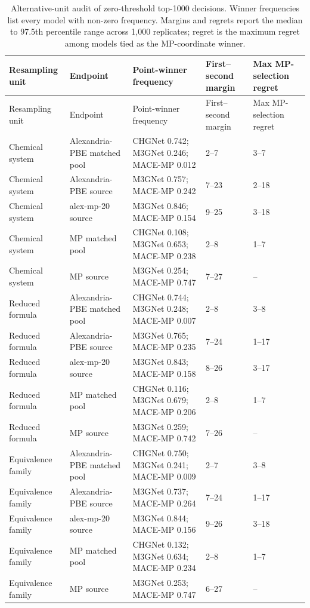 \begin{longtable}{@{}P{0.16\textwidth}P{0.20\textwidth}P{0.31\textwidth}P{0.10\textwidth}P{0.10\textwidth}@{}}
\caption{Alternative-unit audit of zero-threshold top-1000 decisions. Winner frequencies list every model with non-zero frequency. Margins and regrets report the median to 97.5th percentile range across 1,000 replicates; regret is the maximum regret among models tied as the MP-coordinate winner.}\label{tab:a1-decisions}\\
\toprule
Resampling unit & Endpoint & Point-winner frequency & First--second margin & Max MP-selection regret \\
\midrule
\endfirsthead
\toprule
Resampling unit & Endpoint & Point-winner frequency & First--second margin & Max MP-selection regret \\
\midrule
\endhead
\bottomrule
\endfoot
Chemical system & Alexandria-PBE matched pool & CHGNet 0.742; M3GNet 0.246; MACE-MP 0.012 & 2--7 & 3--7 \\
Chemical system & Alexandria-PBE source & M3GNet 0.757; MACE-MP 0.242 & 7--23 & 2--18 \\
Chemical system & alex-mp-20 source & M3GNet 0.846; MACE-MP 0.154 & 9--25 & 3--18 \\
Chemical system & MP matched pool & CHGNet 0.108; M3GNet 0.653; MACE-MP 0.238 & 2--8 & 1--7 \\
Chemical system & MP source & M3GNet 0.254; MACE-MP 0.747 & 7--27 & -- \\
Reduced formula & Alexandria-PBE matched pool & CHGNet 0.744; M3GNet 0.248; MACE-MP 0.007 & 2--8 & 3--8 \\
Reduced formula & Alexandria-PBE source & M3GNet 0.765; MACE-MP 0.235 & 7--24 & 1--17 \\
Reduced formula & alex-mp-20 source & M3GNet 0.843; MACE-MP 0.158 & 8--26 & 3--17 \\
Reduced formula & MP matched pool & CHGNet 0.116; M3GNet 0.679; MACE-MP 0.206 & 2--8 & 1--7 \\
Reduced formula & MP source & M3GNet 0.259; MACE-MP 0.742 & 7--26 & -- \\
Equivalence family & Alexandria-PBE matched pool & CHGNet 0.750; M3GNet 0.241; MACE-MP 0.009 & 2--7 & 3--8 \\
Equivalence family & Alexandria-PBE source & M3GNet 0.737; MACE-MP 0.264 & 7--24 & 1--17 \\
Equivalence family & alex-mp-20 source & M3GNet 0.844; MACE-MP 0.156 & 9--26 & 3--18 \\
Equivalence family & MP matched pool & CHGNet 0.132; M3GNet 0.634; MACE-MP 0.234 & 2--8 & 1--7 \\
Equivalence family & MP source & M3GNet 0.253; MACE-MP 0.747 & 6--27 & -- \\
\end{longtable}

\endgroup
